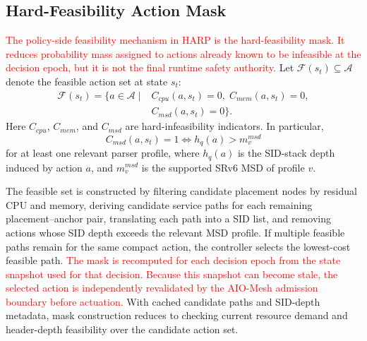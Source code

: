 \documentclass[final,5p]{elsarticle}
\newcommand{\rev}[1]{\textcolor{red}{#1}}
\begin{document}
\subsection{Hard-Feasibility Action Mask}
\label{subsec:harp_masking}

\rev{The policy-side feasibility mechanism in HARP is the hard-feasibility mask. It reduces probability mass assigned to actions already known to be infeasible at the decision epoch, but it is not the final runtime safety authority.} Let \(\mathcal{F}(s_t)\subseteq\mathcal{A}\) denote the feasible action set at state \(s_t\):
\begin{equation}
\begin{aligned}
\mathcal{F}(s_t)=
\{a\in\mathcal{A}\mid
& C_{cpu}(a,s_t)=0,\;
  C_{mem}(a,s_t)=0, \\
& C_{msd}(a,s_t)=0
\}.
\end{aligned}
\label{eq:feasible_set}
\end{equation}
Here \(C_{cpu}\), \(C_{mem}\), and \(C_{msd}\) are hard-infeasibility indicators. In particular,
\begin{equation}
    C_{msd}(a,s_t)=1
    \Longleftrightarrow
    h_q(a)>m_v^{msd}
\end{equation}
for at least one relevant parser profile, where \(h_q(a)\) is the SID-stack depth induced by action \(a\), and \(m_v^{msd}\) is the supported SRv6 MSD of profile \(v\).

The feasible set is constructed by filtering candidate placement nodes by residual CPU and memory, deriving candidate service paths for each remaining placement--anchor pair, translating each path into a SID list, and removing actions whose SID depth exceeds the relevant MSD profile. If multiple feasible paths remain for the same compact action, the controller selects the lowest-cost feasible path. \rev{The mask is recomputed for each decision epoch from the state snapshot used for that decision. Because this snapshot can become stale, the selected action is independently revalidated by the AIO-Mesh admission boundary before actuation.} With cached candidate paths and SID-depth metadata, mask construction reduces to checking current resource demand and header-depth feasibility over the candidate action set.
\end{document}
